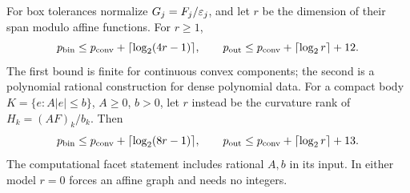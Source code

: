 \begin{theorem}\label{thm:vector-rank}
For box tolerances normalize $G_j=F_j/\varepsilon_j$, and let $r$ be the
dimension of their span modulo affine functions. For $r\ge1$,
\begin{equation}\label{eq:vector-box-rank}
 p_{\mathrm{bin}}\le p_{\mathrm{conv}}+\lceil\log_2(4r-1)\rceil,
 \qquad
 p_{\mathrm{out}}\le p_{\mathrm{conv}}+\lceil\log_2r\rceil+12.
\end{equation}
The first bound is finite for continuous convex components; the second
is a polynomial rational construction for dense polynomial data.
For a compact body $K=\{e:A|e|\le b\}$, $A\ge0$, $b>0$, let $r$ instead
be the curvature rank of $H_k=(AF)_k/b_k$. Then
\begin{equation}\label{eq:vector-facet-rank}
 p_{\mathrm{bin}}\le p_{\mathrm{conv}}+\lceil\log_2(8r-1)\rceil,
 \qquad
 p_{\mathrm{out}}\le p_{\mathrm{conv}}+\lceil\log_2r\rceil+13.
\end{equation}
The computational facet statement includes rational $A,b$ in its input.
In either model $r=0$ forces an affine graph and needs no integers.
\end{theorem}
